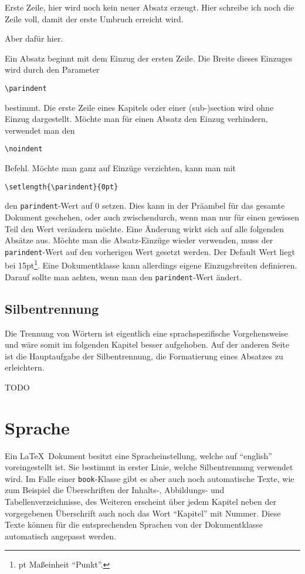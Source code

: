 \bigskip

\small
Erste Zeile,
hier wird noch kein neuer Absatz erzeugt. Hier schreibe ich noch die Zeile voll, damit der erste Umbruch erreicht wird.

Aber dafür hier.
\normalfont

\bigskip

Ein Absatz beginnt mit dem Einzug der ersten Zeile. Die Breite dieses Einzuges wird durch den Parameter 
\begin{verbatim}
\parindent
\end{verbatim}
bestimmt. Die erste Zeile eines Kapitels oder einer (sub-)section wird ohne Einzug dargestellt. Möchte man für einen Absatz den Einzug verhindern, verwendet man den 
\begin{verbatim}
\noindent
\end{verbatim}
Befehl. Möchte man ganz auf Einzüge verzichten, kann man mit 
\begin{verbatim}
\setlength{\parindent}{0pt}
\end{verbatim}
den \texttt{parindent}-Wert auf 0 setzen. Dies kann in der Präambel für das gesamte Dokument geschehen, oder auch zwischendurch, wenn man nur für einen gewissen Teil den Wert verändern möchte. Eine Änderung wirkt sich auf alle folgenden Absätze aus. Möchte man die Absatz-Einzüge wieder verwenden, muss der \texttt{parindent}-Wert auf den vorherigen Wert gesetzt werden. Der Default Wert liegt bei 15pt\footnote{pt Maßeinheit "`Punkt"'.}. Eine Dokumentklasse kann allerdings eigene Einzugsbreiten definieren. Darauf sollte man achten, wenn man den \texttt{parindent}-Wert ändert.

\subsection{Silbentrennung}

Die Trennung von Wörtern ist eigentlich eine sprachspezifische Vorgehensweise und wäre somit im folgenden Kapitel besser aufgehoben. Auf der anderen Seite ist die Hauptaufgabe der Silbentrennung, die Formatierung eines Absatzes zu erleichtern. 

TODO

\section{Sprache}

Ein \LaTeX\ Dokument besitzt eine Spracheinstellung, welche auf "`english"' voreingestellt ist. Sie bestimmt in erster Linie, welche Silbentrennung verwendet wird. Im Falle einer \texttt{book}-Klasse gibt es aber auch noch automatische Texte, wie zum Beispiel die Überschriften der Inhalts-, Abbildungs- und Tabellenverzeichnisse, des Weiteren erscheint über jedem Kapitel neben der vorgegebenen Überschrift auch noch das Wort "`Kapitel"' mit Nummer. Diese Texte können für die entsprechenden Sprachen von der Dokumentklasse automatisch angepasst werden. 

